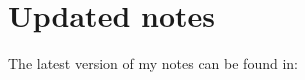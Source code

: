 \documentclass[12pt]{article}
\begin{document}
\newpage
\section{Updated notes}
The latest version of my notes can be found in:




\newpage

\printbibliography
\end{document}
